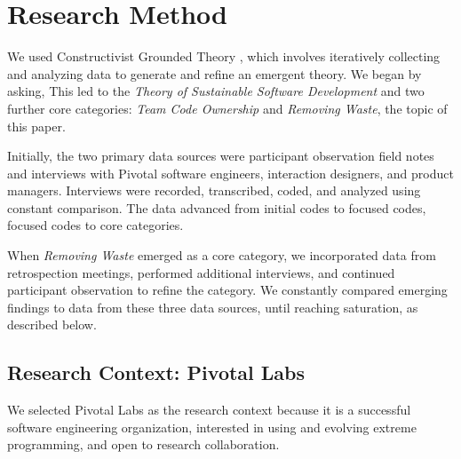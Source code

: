 

\section{Research Method}
\label{ResearchMethod}

We used Constructivist Grounded Theory \cite{Charmaz}, which involves iteratively collecting and analyzing data to generate and refine an emergent theory. We began by asking,  This led to the \textit{Theory of Sustainable Software Development} \cite{SedanoSustainableSoftware} and two further core categories: \textit{Team Code Ownership} \cite{SedanoTeamCodeOwnership} and \textit{Removing Waste}, the topic of this paper.

Initially, the two primary data sources were participant observation field notes and interviews with Pivotal software engineers, interaction designers, and product managers. Interviews were recorded, transcribed, coded, and analyzed using constant comparison. The data advanced from initial codes to focused codes, focused codes to core categories.

When \textit{Removing Waste} emerged as a core category, we incorporated data from retrospection meetings, performed additional interviews, and continued participant observation to refine the category.  We constantly compared emerging findings to data from these three data sources, until reaching saturation, as described below.

\subsection{Research Context: Pivotal Labs}
We selected Pivotal Labs as the research context because it is a successful software engineering organization, interested in using and evolving extreme programming, and open to research collaboration. 

